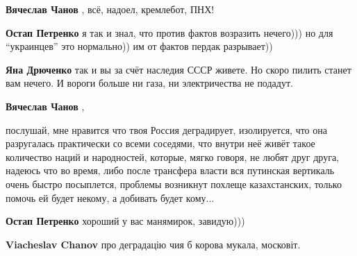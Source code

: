 \begin{itemize}
\begin{itemize}
\textbf{Вячеслав Чанов} , всё, надоел, кремлебот, ПНХ!

\textbf{Остап Петренко} я так и знал, что против фактов возразить нечего))) но для \enquote{украинцев} это нормально)) им от фактов пердак разрывает))

\textbf{Яна Дрюченко} так и вы за счёт наследия СССР живете. Но скоро пилить станет вам нечего. И вороги больше ни газа, ни электричества не подадут.

\textbf{Вячеслав Чанов} , 

послушай, мне нравится что твоя Россия деградирует, изолируется, что она
разругалась практически со всеми соседями, что внутри неё живёт такое
количество наций и народностей, которые, мягко говоря, не любят друг друга,
надеюсь что во время, либо после трансфера власти вся путинская вертикаль очень
быстро посыплется, проблемы возникнут похлеще казахстанских, только помочь ей
будет некому, а добивать будет кому...


\textbf{Остап Петренко} хороший у вас манямирок, завидую)))

\textbf{Viacheslav Chanov} про деградацію чия б корова мукала, московіт.

\end{itemize} %

\end{itemize} %
